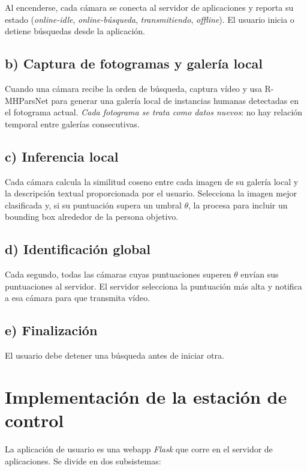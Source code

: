 Al encenderse, cada cámara se conecta al servidor de aplicaciones
y reporta su estado (\emph{online-idle}, \emph{online-búsqueda},
\emph{transmitiendo}, \emph{offline}). El usuario inicia o detiene
búsquedas desde la aplicación.

\subsection*{b) Captura de fotogramas y galería local}

Cuando una cámara recibe la orden de búsqueda, captura vídeo y
usa R-MHParsNet para generar una galería local de instancias
humanas detectadas en el fotograma actual. \emph{Cada fotograma
se trata como datos nuevos}: no hay relación temporal entre
galerías consecutivas.

\subsection*{c) Inferencia local}

Cada cámara calcula la similitud coseno entre cada imagen de su
galería local y la descripción textual proporcionada por el
usuario. Selecciona la imagen mejor clasificada y, si su
puntuación supera un umbral $\theta$, la procesa para incluir
un bounding box alrededor de la persona objetivo.

\subsection*{d) Identificación global}

Cada segundo, todas las cámaras cuyas puntuaciones superen
$\theta$ envían sus puntuaciones al servidor. El servidor
selecciona la puntuación más alta y notifica a esa cámara para
que transmita vídeo.

\subsection*{e) Finalización}

El usuario debe detener una búsqueda antes de iniciar otra.

\section{Implementación de la estación de control}

La aplicación de usuario es una webapp \emph{Flask}
\cite{grinberg2018flask} que corre en el servidor de aplicaciones.
Se divide en dos subsistemas:

